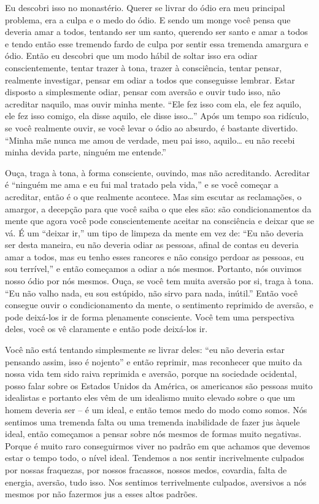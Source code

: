 Eu descobri isso no monastério. Querer se livrar do ódio era meu
principal problema, era a culpa e o medo do ódio. E sendo um monge você
pensa que deveria amar a todos, tentando ser um santo, querendo ser
santo e amar a todos e tendo então esse tremendo fardo de culpa por
sentir essa tremenda amargura e ódio. Então eu descobri que um modo
hábil de soltar isso era odiar conscientemente, tentar trazer à tona,
trazer à consciência, tentar pensar, realmente investigar, pensar em
odiar a todos que conseguisse lembrar. Estar disposto a simplesmente
odiar, pensar com aversão e ouvir tudo isso, não acreditar naquilo, mas
ouvir minha mente. “Ele fez isso com ela, ele fez aquilo, ele fez isso
comigo, ela disse aquilo, ele disse isso…” Após um tempo soa ridículo,
se você realmente ouvir, se você levar o ódio ao absurdo, é bastante
divertido. “Minha mãe nunca me amou de verdade, meu pai isso, aquilo…
eu não recebi minha devida parte, ninguém me entende.” 

Ouça, traga à tona, à forma consciente, ouvindo, mas não
acreditando. Acreditar é “ninguém me ama e eu fui mal tratado pela
vida,” e se você começar a acreditar, então é o que realmente acontece.
Mas sim escutar as reclamações, o amargor, a decepção para que você
saiba o que eles são: são condicionamentos da mente que agora você pode
conscientemente aceitar na consciência e deixar que se vá. É um “deixar
ir,” um tipo de limpeza da mente em vez de: “Eu não deveria ser desta
maneira, eu não deveria odiar as pessoas, afinal de contas eu deveria
amar a todos, mas eu tenho esses rancores e não consigo perdoar as
pessoas, eu sou terrível,” e então começamos a odiar a nós mesmos.
Portanto, nós ouvimos nosso ódio por nós mesmos. Ouça, se você tem
muita aversão por si, traga à tona. “Eu não valho nada, eu sou
estúpido, não sirvo para nada, inútil.” Então você consegue ouvir o
condicionamento da mente, o sentimento reprimido de aversão, e pode
deixá-los ir de forma plenamente consciente. Você tem uma perspectiva
deles, você os vê claramente e então pode deixá-los ir.

Você não está tentando simplesmente se livrar deles: “eu não deveria
estar pensando assim, isso é nojento” e então reprimir, mas reconhecer
que muito da nossa vida tem sido raiva reprimida e aversão, porque na
sociedade ocidental, posso falar sobre os Estados Unidos da América, os
americanos são pessoas muito idealistas e portanto eles vêm de um
idealismo muito elevado sobre o que um homem deveria ser – é um ideal,
e então temos medo do modo como somos. Nós sentimos uma tremenda falta
ou uma tremenda inabilidade de fazer jus àquele ideal, então começamos
a pensar sobre nós mesmos de formas muito negativas. Porque é muito
raro conseguirmos viver no padrão em que achamos que devemos estar o
tempo todo, o nível ideal. Tendemos a nos sentir incrivelmente culpados
por nossas fraquezas, por nossos fracassos, nossos medos, covardia,
falta de energia, aversão, tudo isso. Nos sentimos terrivelmente
culpados, aversivos a nós mesmos por não fazermos jus a esses altos
padrões.

